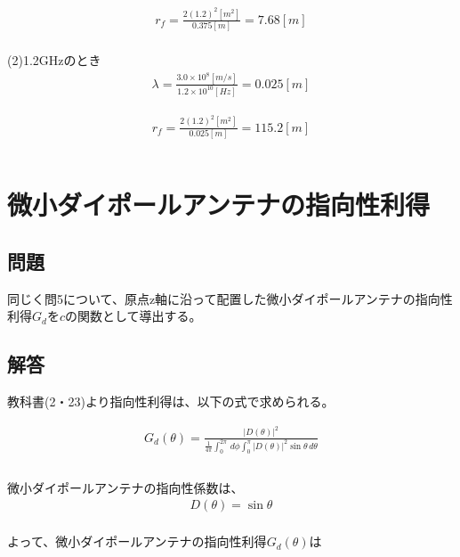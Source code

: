 \documentclass[dvipdfmx,autodetect-engine,titlepage]{jsarticle}
\begin{document}
\begin{eqnarray*}
  r_f = \frac{2(1.2)^2[m^2]}{0.375[m]}
  = 7.68[m]\\
\end{eqnarray*}

(2)1.2GHzのとき
\begin{eqnarray*}
  \lambda = \frac{3.0 \times  10^8 [m/s]}{1.2 \times 10^10[Hz]}
  =0.025[m]
\end{eqnarray*}

\begin{eqnarray*}
  r_f = \frac{2(1.2)^2[m^2]}{0.025[m]}
  =115.2[m]\\\\
\end{eqnarray*}

\section{微小ダイポールアンテナの指向性利得}
\subsection{問題}
同じく問5について、原点z軸に沿って配置した微小ダイポールアンテナの指向性利得\begin{math}
  G_dをc
\end{math}の関数として導出する。

\subsection{解答}
教科書(2・23)より指向性利得は、以下の式で求められる。

\begin{eqnarray*}
  G_d(\theta) = \frac{{| D(\theta) \vert }^2}{\frac{1}{4\pi} \int_{0}^{2\pi}  \,d\phi \int_{0}^{\pi} {| D(\theta) \vert }^2 \sin\theta \,d\theta } \\\\
\end{eqnarray*}

微小ダイポールアンテナの指向性係数は、
\begin{eqnarray*}
  D(\theta) = \sin\theta \\
\end{eqnarray*}

よって、微小ダイポールアンテナの指向性利得\begin{math}
  G_d(\theta)
\end{math}は
\end{document}
